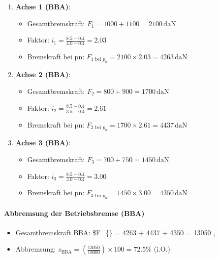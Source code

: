 \documentclass{vorlage-design-main}
\begin{document}
\begin{enumerate}
\def\labelenumi{\arabic{enumi}.}

\item
  \textbf{Achse 1 (BBA)}:

  \begin{itemize}
  
  \item
    Gesamtbremskraft: $F_1 = 1000 + 1100 = 2100 \, \text{daN}$
  \item
    Faktor: $i_1 = \frac{8.5 - 0.4}{4.0 - 0.4} = 2.03$
  \item
    Bremskraft bei pn:
    $F_{1 \text{ bei } p_n} = 2100 \times 2.03 = 4263 \, \text{daN}$
  \end{itemize}
\item
  \textbf{Achse 2 (BBA)}:

  \begin{itemize}
  
  \item
    Gesamtbremskraft: $F_2 = 800 + 900 = 1700 \, \text{daN}$
  \item
    Faktor: $i_2 = \frac{8.5 - 0.4}{3.5 - 0.4} = 2.61$
  \item
    Bremskraft bei pn:
    $F_{2 \text{ bei } p_n} = 1700 \times 2.61 = 4437 \, \text{daN}$
  \end{itemize}
\item
  \textbf{Achse 3 (BBA)}:

  \begin{itemize}
  
  \item
    Gesamtbremskraft: $F_3 = 700 + 750 = 1450 \, \text{daN}$
  \item
    Faktor: $i_3 = \frac{8.5 - 0.4}{3.0 - 0.4} = 3.00$
  \item
    Bremskraft bei pn:
    $F_{3 \text{ bei } p_n} = 1450 \times 3.00 = 4350 \, \text{daN}$
  \end{itemize}
\end{enumerate}

\paragraph{Abbremsung der Betriebsbremse
(BBA)}\label{abbremsung-der-betriebsbremse-bba}

\begin{itemize}
\item
  Gesamtbremskraft BBA: \$F\_\{\} = 4263 + 4437 + 4350 = 13050
  , 
\item
  Abbremsung:
  $z_{\text{BBA}} = \left( \frac{13050}{18000} \right) \times 100 = 72.5\%$
  (i.O.)
\end{itemize}
\end{document}
